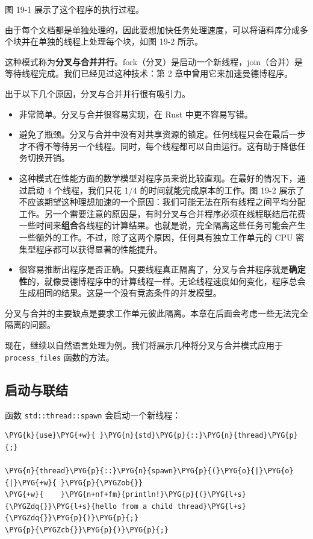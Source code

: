 图 19-1 展示了这个程序的执行过程。


由于每个文档都是单独处理的，因此要想加快任务处理速度，可以将语料库分成多个块并在单独的线程上处理每个块，如图 19-2 所示。


这种模式称为\textbf{分叉与合并并行}。fork（分叉）是启动一个新线程，join（合并）是等待线程完成。我们已经见过这种技术：第 2 章中曾用它来加速曼德博程序。

出于以下几个原因，分叉与合并并行很有吸引力。

\begin{itemize}
\item 非常简单。分叉与合并很容易实现，在 Rust 中更不容易写错。
\item 避免了瓶颈。分叉与合并中没有对共享资源的锁定。任何线程只会在最后一步才不得不等待另一个线程。同时，每个线程都可以自由运行。这有助于降低任务切换开销。
\item 这种模式在性能方面的数学模型对程序员来说比较直观。在最好的情况下，通过启动 4 个线程，我们只花 1/4 的时间就能完成原本的工作。图 19-2 展示了不应该期望这种理想加速的一个原因：我们可能无法在所有线程之间平均分配工作。另一个需要注意的原因是，有时分叉与合并程序必须在线程联结后花费一些时间来\textbf{组合}各线程的计算结果。也就是说，完全隔离这些任务可能会产生一些额外的工作。不过，除了这两个原因，任何具有独立工作单元的 CPU 密集型程序都可以获得显著的性能提升。
\item 很容易推断出程序是否正确。只要线程真正隔离了，分叉与合并程序就是\textbf{确定性}的，就像曼德博程序中的计算线程一样。无论线程速度如何变化，程序总会生成相同的结果。这是一个没有竞态条件的并发模型。
\end{itemize}

分叉与合并的主要缺点是要求工作单元彼此隔离。本章在后面会考虑一些无法完全隔离的问题。

现在，继续以自然语言处理为例。我们将展示几种将分叉与合并模式应用于 \texttt{process\_files} 函数的方法。

\subsection{启动与联结}

函数 \texttt{std::thread::spawn} 会启动一个新线程：

\begin{Verbatim}[commandchars=\\\{\},breaklines=true,breakanywhere=true,fontsize=\codefont,xleftmargin=17bp]
\PYG{k}{use}\PYG{+w}{ }\PYG{n}{std}\PYG{p}{::}\PYG{n}{thread}\PYG{p}{;}

\PYG{n}{thread}\PYG{p}{::}\PYG{n}{spawn}\PYG{p}{(}\PYG{o}{|}\PYG{o}{|}\PYG{+w}{ }\PYG{p}{\PYGZob{}}
\PYG{+w}{    }\PYG{n+nf+fm}{println!}\PYG{p}{(}\PYG{l+s}{\PYGZdq{}}\PYG{l+s}{hello from a child thread}\PYG{l+s}{\PYGZdq{}}\PYG{p}{)}\PYG{p}{;}
\PYG{p}{\PYGZcb{}}\PYG{p}{)}\PYG{p}{;}
\end{Verbatim}

